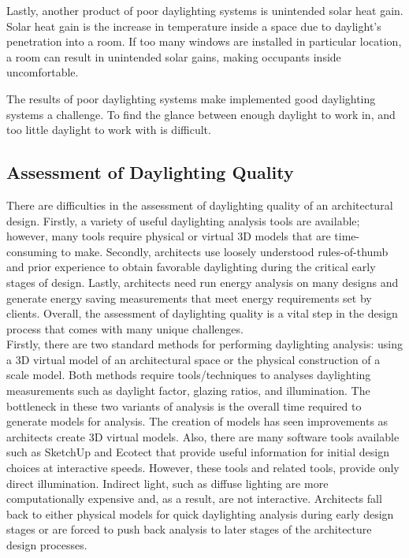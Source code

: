 		Lastly, another product of poor daylighting systems is unintended solar heat gain. Solar heat gain is the increase in temperature inside a space due to daylight's penetration into a room. If too many windows are installed in particular location, a room can result in unintended solar gains, making occupants inside uncomfortable.

		The results of poor daylighting systems make implemented good daylighting systems a challenge. To find the glance between enough daylight to work in, and too little daylight to work with is difficult.

	\subsection{Assessment of Daylighting Quality}

		There are difficulties in the assessment of daylighting quality of an architectural design.
		Firstly, a variety of useful daylighting analysis tools are available; however, many tools require physical or virtual 3D models that are time-consuming to make.
		Secondly, architects use loosely understood rules-of-thumb and prior experience to obtain favorable daylighting during the critical early stages of design.
		Lastly, architects need run energy analysis on many designs and generate energy saving measurements that meet energy requirements set by clients.
		Overall, the assessment of daylighting quality is a vital step in the design process that comes with many unique challenges. \\

		Firstly, there are two standard methods for performing daylighting analysis: using a 3D virtual model of an architectural space or the physical construction of a scale model.
		Both methods require tools/techniques to analyses daylighting measurements such as daylight factor, glazing ratios, and illumination.
		The bottleneck in these two variants of analysis is the overall time required to generate models for analysis. The creation of models has seen improvements as architects create 3D virtual models. 
		Also, there are many software tools available such as SketchUp and Ecotect that provide useful information for initial design choices at interactive speeds.
		However, these tools and related tools, provide only direct illumination. Indirect light, such as diffuse lighting are more computationally expensive and, as a result, are not interactive\cite{Yancy}.
		Architects fall back to either physical models for quick daylighting analysis during early design stages or are forced to push back analysis to later stages of the architecture design processes.\\

